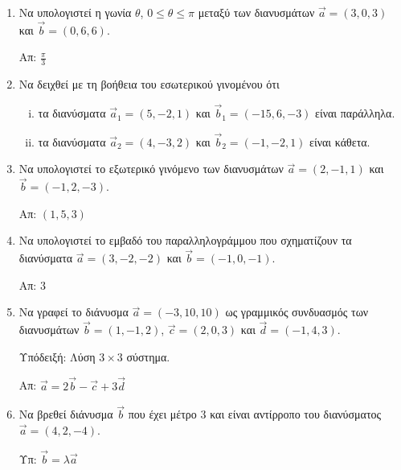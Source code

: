 





\begin{center}
\end{center}

\vspace{\baselineskip}

\begin{enumerate}

	\item Να υπολογιστεί η γωνία $ \theta $, $ 0\leq \theta \leq \pi $ μεταξύ των διανυσμάτων $
		\vec{a} = (3,0,3) $ και $ \vec{b} = (0,6,6) $.

		\hfill Απ: $ \frac{\pi}{3} $

	\item Να δειχθεί με τη βοήθεια του εσωτερικού γινομένου ότι
		\begin{enumerate}[i)]
			\item τα διανύσματα $ \vec{a}_1 = (5,-2,1) $ και $ \vec{b}_1 = (-15,6,-3) $ είναι παράλληλα.
			\item τα διανύσματα $ \vec{a}_2 = (4,-3,2) $ και $ \vec{b}_2 = (-1,-2,1) $ είναι κάθετα.
		\end{enumerate}

	\item Να υπολογιστεί το εξωτερικό γινόμενο των διανυσμάτων $ \vec{a} = (2,-1,1) $ και $ \vec{b} = (-1,2,-3) $.

		\hfill Απ: $ (1,5,3) $

	\item Να υπολογιστεί το εμβαδό του παραλληλογράμμου που σχηματίζουν τα διανύσματα $ \vec{a} = (3,-2,-2) $ και $ \vec{b} = (-1,0,-1) $.

		\hfill Απ: $3 $ 
	\item Να γραφεί το διάνυσμα $ \vec{a}=(-3,10,10) $ ως γραμμικός συνδυασμός των διανυσμάτων $\vec{b}=(1,-1,2)$, $ \vec{c}=(2,0,3) $ και $ \vec{d}=(-1,4,3) $.  

		\hfill Υπόδειξή: Λύση $ 3\times 3 $ σύστημα. 

		\hfill Απ: $ \vec{a}=2\vec{b}-\vec{c}+3\vec{d} $

	\item Να βρεθεί διάνυσμα $ \vec{b} $ που έχει μέτρο $3$ και είναι αντίρροπο του διανύσματος $ \vec{a}=(4,2,-4)$.

		\hfill Υπ: $ \vec{b} = \lambda \vec{a} $		


\end{enumerate}
